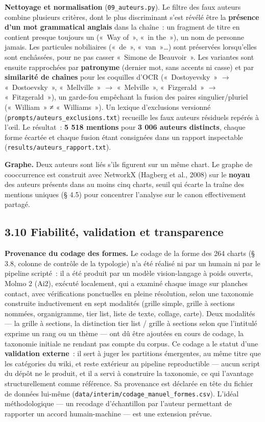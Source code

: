 \documentclass[11pt,a4paper]{article}
\begin{document}
\textbf{Nettoyage et normalisation} (\texttt{09\_auteurs.py}). Le filtre des faux auteurs combine plusieurs critères, dont le plus discriminant s'est révélé être la \textbf{présence d'un mot grammatical anglais} dans la chaîne~: un fragment de titre en contient presque toujours un («~Way of~», «~in the~»), un nom de personne jamais. Les particules nobiliaires («~de~», «~van~»…) sont préservées lorsqu'elles sont enchâssées, pour ne pas casser «~Simone de Beauvoir~». Les variantes sont ensuite rapprochées par \textbf{patronyme} (dernier mot, sans accents ni casse) et par \textbf{similarité de chaînes} pour les coquilles d'OCR («~Dostoyevsky~» $\rightarrow$ «~Dostoevsky~», «~Mellville~» $\rightarrow$ «~Melville~», «~Fizgerald~» $\rightarrow$ «~Fitzgerald~»), un garde-fou empêchant la fusion des paires singulier/pluriel («~William~» ≠ «~Williams~»). Un lexique d'exclusions versionné (\texttt{prompts/auteurs\_exclusions.txt}) recueille les faux auteurs résiduels repérés à l'œil. Le résultat~: \textbf{5 518 mentions} pour \textbf{3 006 auteurs distincts}, chaque forme écartée et chaque fusion étant consignées dans un rapport inspectable (\texttt{results/auteurs\_rapport.txt}).

\textbf{Graphe.} Deux auteurs sont liés s'ils figurent sur un même chart. Le graphe de cooccurrence est construit avec NetworkX (Hagberg et al., 2008) sur le \textbf{noyau} des auteurs présents dans au moins cinq charts, seuil qui écarte la traîne des mentions uniques (§ 4.5) pour concentrer l'analyse sur le canon effectivement partagé.

\subsection*{3.10 Fiabilité, validation et transparence}

\textbf{Provenance du codage des formes.} Le codage de la forme des 264 charts (§ 3.8, colonne de contrôle de la typologie) n'a été réalisé ni par un humain ni par le pipeline scripté~: il a été produit par un modèle vision-langage à poids ouverts, Molmo 2 (Ai2), exécuté localement, qui a examiné chaque image sur planches contact, avec vérifications ponctuelles en pleine résolution, selon une taxonomie construite inductivement en sept modalités (grille simple, grille à sections nommées, organigramme, tier list, liste de texte, collage, carte). Deux modalités --- la grille à sections, la distinction tier list / grille à sections selon que l'intitulé exprime un rang ou un thème --- ont dû être ajoutées en cours de codage, la taxonomie initiale ne rendant pas compte du corpus. Ce codage a le statut d'une \textbf{validation externe}~: il sert à juger les partitions émergentes, au même titre que les catégories du wiki, et reste extérieur au pipeline reproductible --- aucun script du dépôt ne le produit, et il a servi à construire la taxonomie, ce qui l'avantage structurellement comme référence. Sa provenance est déclarée en tête du fichier de données lui-même (\texttt{data/interim/codage\_manuel\_formes.csv}). L'idéal méthodologique --- un recodage d'échantillon par l'auteur permettant de rapporter un accord humain-machine --- est une extension prévue.
\end{document}
